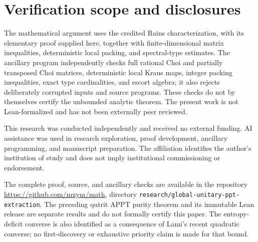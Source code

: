 \documentclass[11pt]{article}
\begin{document}
\section*{Verification scope and disclosures}
The mathematical argument uses the credited Rains characterization, with its elementary proof supplied here, together with finite-dimensional matrix inequalities, deterministic local packing, and spectral-type estimates. The ancillary program independently checks full rational Choi and partially transposed Choi matrices, deterministic local Kraus maps, integer packing inequalities, exact type cardinalities, and escort algebra; it also rejects deliberately corrupted inputs and source programs. These checks do not by themselves certify the unbounded analytic theorem. The present work is not Lean-formalized and has not been externally peer reviewed.

This research was conducted independently and received no external funding. AI assistance was used in research exploration, proof development, ancillary programming, and manuscript preparation. The affiliation identifies the author's institution of study and does not imply institutional commissioning or endorsement.

The complete proof, source, and ancillary checks are available in the repository \url{https://github.com/mxym/math}, directory \texttt{research/global-unitary-ppt-extraction}. The preceding qutrit APPT purity theorem and its immutable Lean release are separate results and do not formally certify this paper. The entropy-deficit converse is also identified as a consequence of Lami's recent quadratic converse; no first-discovery or exhaustive priority claim is made for that bound.
\end{document}
